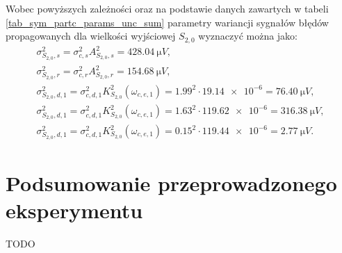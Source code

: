 Wobec powyższych zależności oraz na podstawie danych zawartych w tabeli \ref{tab_sym_partc_params_unc_sum} parametry wariancji sygnałów błędów propagowanych dla wielkości wyjściowej $S_{2,0}$ wyznaczyć można jako:
\begin{gather}
\sigma_{S_{2,0},s}^{2} = \sigma_{c,s}^{2} A_{S_{2,0},s}^{2} = \qty{428.04}{\micro V} \label{eqn_sym_partd_output_var_stat_S_2_0}, \\
\sigma_{S_{2,0},r}^{2} = \sigma_{c,r}^{2} A_{S_{2,0},r}^{2} = \qty{154.68}{\micro V} \label{eqn_sym_partd_output_var_rand_S_2_0}, \\
\sigma_{S_{2,0},d,1}^{2} = \sigma_{c,d,1}^{2} K_{S_{2,0}}^{2}(\omega_{c,e,1}) = {1.99}^{2} \cdot \num{19.14e-6} = \qty{76.40}{\micro V} \label{eqn_sym_partd_output_var_dyn_1_S_2_0}, \\
\sigma_{S_{2,0},d,1}^{2} = \sigma_{c,d,1}^{2} K_{S_{2,0}}^{2}\left(\omega_{c,e,1}\right) = {1.63}^{2} \cdot \num{119.62e-6} = \qty{316.38}{\micro V} \label{eqn_sym_partd_output_var_dyn_2_S_2_0}, \\
\sigma_{S_{2,0},d,1}^{2} = \sigma_{c,d,1}^{2} K_{S_{2,0}}^{2}(\omega_{c,e,1}) = {0.15}^{2} \cdot \num{119.44e-6} = \qty{2.77}{\micro V} \label{eqn_sym_partd_output_var_dyn_3_S_2_0}.
\end{gather}

\section{Podsumowanie przeprowadzonego eksperymentu}

TODO

